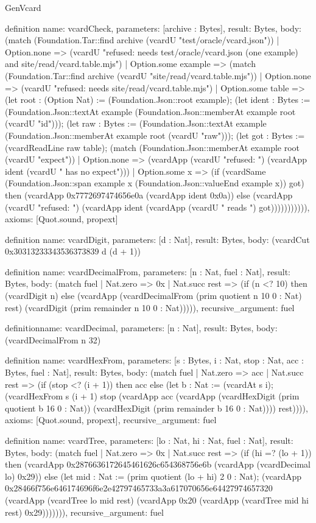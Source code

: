 \begin{lexlean}{GenVcard}
\begin{semanticmodule}
definition{
  name: vcardCheck,
  parameters: [archive : Bytes],
  result: Bytes,
  body: (match (Foundation.Tar::find archive (vcardU "test/oracle/vcard.json"))
    | Option.none => (vcardU "refused: needs test/oracle/vcard.json (one example) and site/read/vcard.table.mjs")
    | Option.some example => (match (Foundation.Tar::find archive (vcardU "site/read/vcard.table.mjs"))
      | Option.none => (vcardU "refused: needs site/read/vcard.table.mjs")
      | Option.some table => (let root : (Option Nat) := (Foundation.Json::root example); (let ident : Bytes := (Foundation.Json::textAt example (Foundation.Json::memberAt example root (vcardU "id"))); (let raw : Bytes := (Foundation.Json::textAt example (Foundation.Json::memberAt example root (vcardU "raw"))); (let got : Bytes := (vcardReadLine raw table); (match (Foundation.Json::memberAt example root (vcardU "expect"))
        | Option.none => (vcardApp (vcardU "refused: ") (vcardApp ident (vcardU " has no expect")))
        | Option.some x => (if (vcardSame (Foundation.Json::span example x (Foundation.Json::valueEnd example x)) got) then (vcardApp 0x7772697474656e0a (vcardApp ident 0x0a)) else (vcardApp (vcardU "refused: ") (vcardApp ident (vcardApp (vcardU " reads ") got))))))))))),
  axioms: [Quot.sound, propext]
}

definition{
  name: vcardDigit,
  parameters: [d : Nat],
  result: Bytes,
  body: (vcardCut 0x30313233343536373839 d (d + 1))
}

definition{
  name: vcardDecimalFrom,
  parameters: [n : Nat, fuel : Nat],
  result: Bytes,
  body: (match fuel
    | Nat.zero => 0x
    | Nat.succ rest => (if (n <? 10) then (vcardDigit n) else (vcardApp (vcardDecimalFrom (prim quotient n 10 0 : Nat) rest) (vcardDigit (prim remainder n 10 0 : Nat))))),
  recursive_argument: fuel
}

definition{name: vcardDecimal, parameters: [n : Nat], result: Bytes, body: (vcardDecimalFrom n 32)}

definition{
  name: vcardHexFrom,
  parameters: [s : Bytes, i : Nat, stop : Nat, acc : Bytes, fuel : Nat],
  result: Bytes,
  body: (match fuel
    | Nat.zero => acc
    | Nat.succ rest => (if (stop <? (i + 1)) then acc else (let b : Nat := (vcardAt s i); (vcardHexFrom s (i + 1) stop (vcardApp acc (vcardApp (vcardHexDigit (prim quotient b 16 0 : Nat)) (vcardHexDigit (prim remainder b 16 0 : Nat)))) rest)))),
  axioms: [Quot.sound, propext],
  recursive_argument: fuel
}

definition{
  name: vcardTree,
  parameters: [lo : Nat, hi : Nat, fuel : Nat],
  result: Bytes,
  body: (match fuel
    | Nat.zero => 0x
    | Nat.succ rest => (if (hi =? (lo + 1)) then (vcardApp 0x2876636172645461626c654368756e6b (vcardApp (vcardDecimal lo) 0x29)) else (let mid : Nat := (prim quotient (lo + hi) 2 0 : Nat); (vcardApp 0x28466f756e646174696f6e2e42797465733a3a617070656e64427974657320 (vcardApp (vcardTree lo mid rest) (vcardApp 0x20 (vcardApp (vcardTree mid hi rest) 0x29))))))),
  recursive_argument: fuel
}


\end{semanticmodule}
\end{lexlean}
